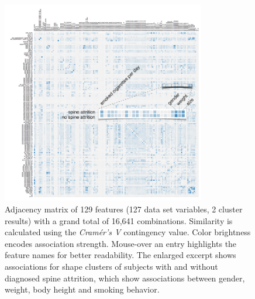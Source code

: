 \documentclass[journal]{style/vgtc} 			          %
\begin{document}
\begin{figure}[htb]
 \centering
 \includegraphics[width=3.5in]{figures/similarity_matrix}
 \caption{Adjacency matrix of 129 features (127 data set variables, 2 cluster results) with a grand total of 16,641 combinations.
 Similarity is calculated using the \emph{Cram\'{e}r's V} contingency value.
 Color brightness encodes association strength.
 Mouse-over an entry highlights the feature names for better readability.
 The enlarged excerpt shows associations for shape clusters of subjects with and without diagnosed spine attrition, which show associations between gender, weight, body height and smoking behavior.
 }
 \label{fig:similarity}
\end{figure}
\end{document}
